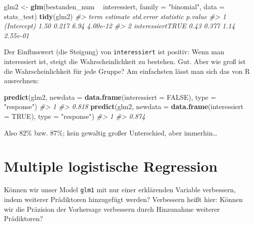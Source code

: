 \documentclass[12pt,ngerman,]{book}
\makeatletter
\newenvironment{Shaded}{\begin{snugshade}}{\end{snugshade}}
\newcommand{\KeywordTok}[1]{\textcolor[rgb]{0.13,0.29,0.53}{\textbf{#1}}}
\newcommand{\DataTypeTok}[1]{\textcolor[rgb]{0.13,0.29,0.53}{#1}}
\newcommand{\StringTok}[1]{\textcolor[rgb]{0.31,0.60,0.02}{#1}}
\newcommand{\CommentTok}[1]{\textcolor[rgb]{0.56,0.35,0.01}{\textit{#1}}}
\newcommand{\OtherTok}[1]{\textcolor[rgb]{0.56,0.35,0.01}{#1}}
\newcommand{\OperatorTok}[1]{\textcolor[rgb]{0.81,0.36,0.00}{\textbf{#1}}}
\newcommand{\NormalTok}[1]{#1}
\newenvironment{kframe}{%
\medskip{}
\setlength{\fboxsep}{.8em}
 \def\at@end@of@kframe{}%
 \ifinner\ifhmode%
  \def\at@end@of@kframe{\end{minipage}}%
  \begin{minipage}{\columnwidth}%
 \fi\fi%
 \def\FrameCommand##1{\hskip\@totalleftmargin \hskip-\fboxsep
 \colorbox{shadecolor}{##1}\hskip-\fboxsep
     \hskip-\linewidth \hskip-\@totalleftmargin \hskip\columnwidth}%
 \MakeFramed {\advance\hsize-\width
   \@totalleftmargin\z@ \linewidth\hsize
   \@setminipage}}%
 {\par\unskip\endMakeFramed%
 \at@end@of@kframe}
\renewenvironment{Shaded}{\begin{kframe}}{\end{kframe}}
\theoremstyle{definition}
\theoremstyle{definition}
\theoremstyle{remark}
\makeatother
\begin{document}
\begin{Shaded}
\begin{Highlighting}[]
\NormalTok{glm2 <-}\StringTok{ }\KeywordTok{glm}\NormalTok{(bestanden_num }\OperatorTok{~}\StringTok{ }\NormalTok{interessiert, }
               \DataTypeTok{family =} \StringTok{"binomial"}\NormalTok{,}
               \DataTypeTok{data =}\NormalTok{ stats_test)}
\KeywordTok{tidy}\NormalTok{(glm2)}
\CommentTok{#>               term estimate std.error statistic  p.value}
\CommentTok{#> 1      (Intercept)     1.50     0.217      6.94 4.00e-12}
\CommentTok{#> 2 interessiertTRUE     0.43     0.377      1.14 2.55e-01}
\end{Highlighting}
\end{Shaded}

Der Einflusswert (die Steigung) von \texttt{interessiert} ist positiv:
Wenn man interessiert ist, steigt die Wahrscheinlichkeit zu bestehen.
Gut. Aber wie groß ist die Wahrscheinlichkeit für jede Gruppe? Am
einfachsten lässt man sich das von R ausrechnen:

\begin{Shaded}
\begin{Highlighting}[]
\KeywordTok{predict}\NormalTok{(glm2, }\DataTypeTok{newdata =} \KeywordTok{data.frame}\NormalTok{(}\DataTypeTok{interessiert =} \OtherTok{FALSE}\NormalTok{), }
        \DataTypeTok{type =} \StringTok{"response"}\NormalTok{)}
\CommentTok{#>     1 }
\CommentTok{#> 0.818}
\KeywordTok{predict}\NormalTok{(glm2, }\DataTypeTok{newdata =} \KeywordTok{data.frame}\NormalTok{(}\DataTypeTok{interessiert =} \OtherTok{TRUE}\NormalTok{), }
        \DataTypeTok{type =} \StringTok{"response"}\NormalTok{)}
\CommentTok{#>     1 }
\CommentTok{#> 0.874}
\end{Highlighting}
\end{Shaded}

Also 82\% bzw. 87\%; kein gewaltig großer Unterschied, aber
immerhin\ldots{}

\section{Multiple logistische
Regression}\label{multiple-logistische-regression}

Können wir unser Model \texttt{glm1} mit nur einer erklärenden Variable
verbessern, indem weiterer Prädiktoren hinzugefügt werden? Verbessern
heißt hier: Können wir die Präzision der Vorhersage verbessern durch
Hinzunahme weiterer Prädiktoren?
\end{document}
